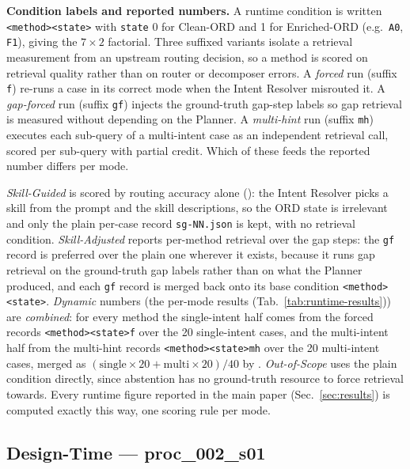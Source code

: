\medskip\noindent\textbf{Condition labels and reported numbers.} A runtime condition is written \texttt{<method><state>} with \texttt{state} 0 for Clean-ORD and 1 for Enriched-ORD (e.g.\ \texttt{A0}, \texttt{F1}), giving the $7\times2$ factorial. Three suffixed variants isolate a retrieval measurement from an upstream routing decision, so a method is scored on retrieval quality rather than on router or decomposer errors. A \emph{forced} run (suffix \texttt{f}) re-runs a case in its correct mode when the Intent Resolver misrouted it. A \emph{gap-forced} run (suffix \texttt{gf}) injects the ground-truth gap-step labels so gap retrieval is measured without depending on the Planner. A \emph{multi-hint} run (suffix \texttt{mh}) executes each sub-query of a multi-intent case as an independent retrieval call, scored per sub-query with partial credit. Which of these feeds the reported number differs per mode.

\emph{Skill-Guided} is scored by routing accuracy alone (): the Intent Resolver picks a skill from the prompt and the skill descriptions, so the ORD state is irrelevant and only the plain per-case record \texttt{sg-NN.json} is kept, with no retrieval condition. \emph{Skill-Adjusted} reports per-method retrieval over the gap steps: the \texttt{gf} record is preferred over the plain one wherever it exists, because it runs gap retrieval on the ground-truth gap labels rather than on what the Planner produced, and each \texttt{gf} record is merged back onto its base condition \texttt{<method><state>}. \emph{Dynamic} numbers (the per-mode results (Tab.~\ref{tab:runtime-results})) are \emph{combined}: for every method the single-intent half comes from the forced records \texttt{<method><state>f} over the 20 single-intent cases, and the multi-intent half from the multi-hint records \texttt{<method><state>mh} over the 20 multi-intent cases, merged as $(\text{single}\times 20 + \text{multi}\times 20)/40$ by . \emph{Out-of-Scope} uses the plain condition directly, since abstention has no ground-truth resource to force retrieval towards. Every runtime figure reported in the main paper (Sec.~\ref{sec:results}) is computed exactly this way, one scoring rule per mode.

\subsection{Design-Time --- proc\_002\_s01}
\label{appendix:trace-dt-proc002s01}

